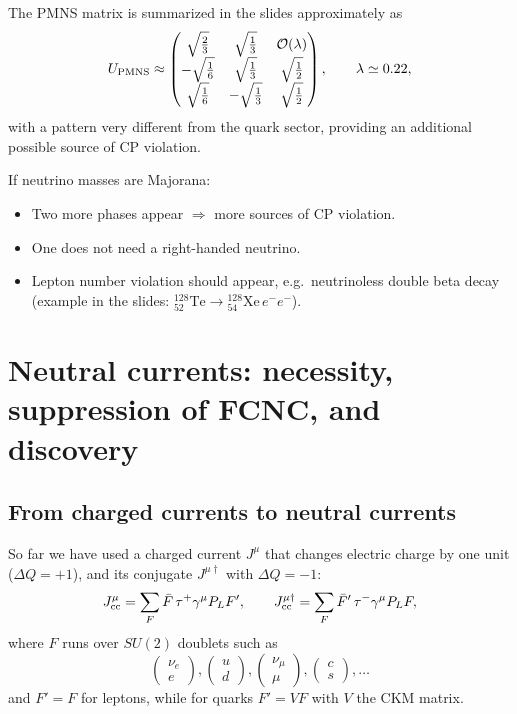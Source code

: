 The PMNS matrix is summarized in the slides approximately as
\begin{equation}
U_{\rm PMNS}\approx
\begin{pmatrix}
\sqrt{\frac{2}{3}} & \sqrt{\frac{1}{3}} & \mathcal{O}(\lambda)\\
-\sqrt{\frac{1}{6}} & \sqrt{\frac{1}{3}} & \sqrt{\frac{1}{2}}\\
\sqrt{\frac{1}{6}} & -\sqrt{\frac{1}{3}} & \sqrt{\frac{1}{2}}
\end{pmatrix},
\qquad
\lambda\simeq 0.22,
\end{equation}
with a pattern very different from the quark sector, providing an additional possible
source of CP violation.

If neutrino masses are Majorana:
\begin{itemize}
  \item Two more phases appear $\Rightarrow$ more sources of CP violation.
  \item One does not need a right-handed neutrino.
  \item Lepton number violation should appear, e.g.\ neutrinoless double beta decay
        (example in the slides: ${}^{128}_{52}\text{Te}\to {}^{128}_{54}\text{Xe}\,e^-e^-$).
\end{itemize}

\section{Neutral currents: necessity, suppression of FCNC, and discovery}
\subsection{From charged currents to neutral currents}
So far we have used a charged current $J^\mu$ that changes electric charge by one unit ($\Delta Q=+1$),
and its conjugate $J^{\mu\dagger}$ with $\Delta Q=-1$:
\begin{equation}
J^\mu_{\rm cc}=\sum_F \bar F\,\tau^+\gamma^\mu P_L F',
\qquad
J^{\mu\dagger}_{\rm cc}=\sum_F \bar F'\,\tau^-\gamma^\mu P_L F,
\end{equation}
where $F$ runs over $SU(2)$ doublets such as
\begin{equation}
\begin{pmatrix}\nu_e\\ e\end{pmatrix},
\begin{pmatrix}u\\ d\end{pmatrix},
\begin{pmatrix}\nu_\mu\\ \mu\end{pmatrix},
\begin{pmatrix}c\\ s\end{pmatrix},
\dots
\end{equation}
and $F'=F$ for leptons, while for quarks $F'=V F$ with $V$ the CKM matrix.

